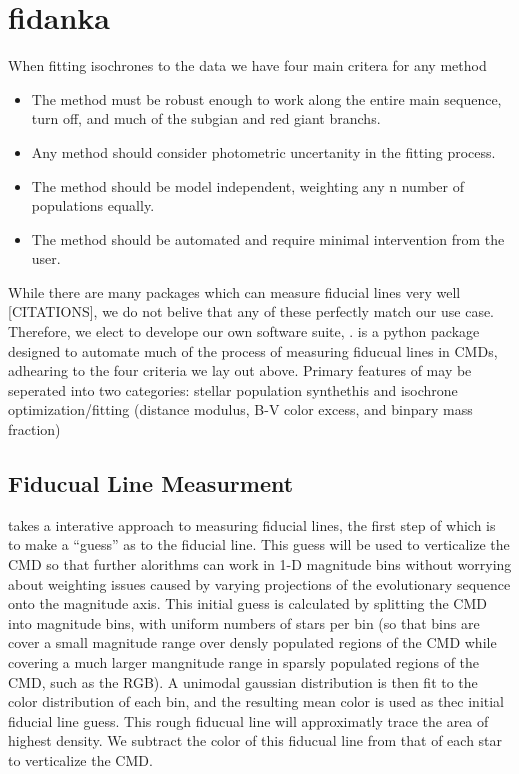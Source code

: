 \section{fidanka}\label{sec:fidanka}
When fitting isochrones to the data we have four main critera for any method

\begin{itemize}
	\item The method must be robust enough to work along the entire main sequence, turn off, and much of the subgian and red giant branchs.
	\item Any method should consider photometric uncertanity in the fitting process.
	\item The method should be model independent, weighting any n number of populations equally.
	\item The method should be automated and require minimal intervention from the user.
\end{itemize}


While there are many packages which can measure fiducial lines very well
{\color{red}[CITATIONS]}, we do not belive that any of these perfectly match
our use case. Therefore, we elect to develope our own software suite,
\fidanka. \fidanka is a python package designed to automate
much of the process of measuring fiducual lines in CMDs, adhearing to the four
criteria we lay out above. Primary features of \fidanka may be seperated into
two categories: stellar population synthethis and isochrone
optimization/fitting (distance modulus, B-V color excess, and binpary mass
fraction)

\subsection{Fiducual Line Measurment}
\fidanka takes a interative approach to measuring fiducial lines, the first
step of which is to make a ``guess'' as to the fiducial line. This guess will
be used to verticalize the CMD so that further alorithms can work in 1-D
magnitude bins without worrying about weighting issues caused by varying
projections of the evolutionary sequence onto the magnitude axis. This initial
guess is calculated by splitting the CMD into magnitude bins, with uniform
numbers of stars per bin (so that bins are cover a small magnitude range over
densly populated regions of the CMD while covering a much larger mangnitude
range in sparsly populated regions of the CMD, such as the RGB). A unimodal
gaussian distribution is then fit to the color distribution of each bin, and
the resulting mean color is used as thec initial fiducial line guess. This
rough fiducual line will approximatly trace the area of highest density. We
subtract the color of this fiducual line from that of each star to verticalize
the CMD. 

